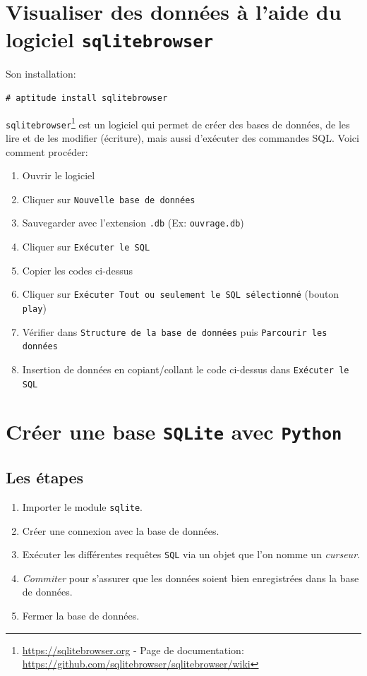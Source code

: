 \documentclass[a4paper,11pt]{book}
\begin{document}
\section{Visualiser des données à l'aide du logiciel \texttt{sqlitebrowser}}
Son installation:
\begin{verbatim}
# aptitude install sqlitebrowser
\end{verbatim}
\medskip

\texttt{sqlitebrowser}\footnote{\url{https://sqlitebrowser.org} - Page de documentation: \url{https://github.com/sqlitebrowser/sqlitebrowser/wiki}} est un logiciel qui permet de créer des bases de données, de les lire et de les modifier (écriture), mais aussi d'exécuter des commandes SQL. Voici comment procéder:
\begin{enumerate}
	\item Ouvrir le logiciel
	\item Cliquer sur \og \texttt{Nouvelle base de données}\fg
	\item Sauvegarder avec l'extension \texttt{.db} (Ex: \texttt{ouvrage.db})
	\item Cliquer sur \og \texttt{Exécuter le SQL}\fg
	\item Copier les codes ci-dessus
	\item Cliquer sur \og \texttt{Exécuter Tout ou seulement le SQL sélectionné}\fg{} (bouton \og \texttt{play}\fg{})
	\item Vérifier dans \og \texttt{Structure de la base de données}\fg{} puis \og \texttt{Parcourir les données}\fg
	\item  Insertion de données en copiant/collant le code ci-dessus dans \og \texttt{Exécuter le SQL}\fg
\end{enumerate}
\medskip

\section{Créer une base \texttt{SQLite} avec \texttt{Python}}
\subsection*{Les étapes}
\begin{enumerate}
	\item Importer le module \texttt{sqlite}.
	\item Créer une connexion avec la base de données.
	\item Exécuter les différentes requêtes \texttt{SQL} via un objet que l'on nomme un \textit{curseur}.
	\item \textit{Commiter} pour s'assurer que les données soient bien enregistrées dans la base de données.
	\item Fermer la base de données.
\end{enumerate}
\medskip
\end{document}
